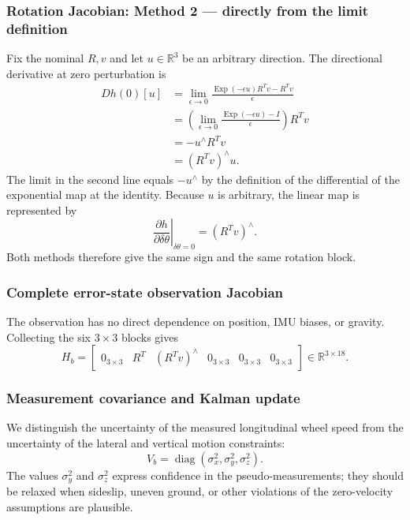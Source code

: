 \documentclass[11pt]{article}
\numberwithin{equation}{section}
\newcommand{\Exp}{\operatorname{Exp}}
\begin{document}
\subsubsection*{Rotation Jacobian: Method 2 --- directly from the limit definition}

Fix the nominal $R,v$ and let $u\in\mathbb R^3$ be an arbitrary
direction. The directional derivative at zero perturbation is
\begin{align}
 Dh(0)[u]
 &=\lim_{\epsilon\to0}
 \frac{\Exp(-\epsilon u)R^Tv-R^Tv}{\epsilon}\\
 &=\left(\lim_{\epsilon\to0}
 \frac{\Exp(-\epsilon u)-I}{\epsilon}\right)R^Tv\\
 &=-u^\wedge R^Tv\\
 &=(R^Tv)^\wedge u.
\end{align}
The limit in the second line equals $-u^\wedge$ by the definition
of the differential of the exponential map at the identity.
Because $u$ is arbitrary, the linear map is represented by
\begin{equation}
\boxed{
\left.\frac{\partial h}{\partial\delta\theta}\right|_{\delta\theta=0}
 =(R^Tv)^\wedge.
}
\end{equation}
Both methods therefore give the same sign and the same rotation block.

\subsubsection*{Complete error-state observation Jacobian}

The observation has no direct dependence on position, IMU biases, or gravity.
Collecting the six $3\times3$ blocks gives
\begin{equation}
\boxed{
H_b=\begin{bmatrix}
0_{3\times3}&R^T&(R^Tv)^\wedge&0_{3\times3}&0_{3\times3}&0_{3\times3}
\end{bmatrix}\in\mathbb R^{3\times18}.
}
\end{equation}

\subsubsection*{Measurement covariance and Kalman update}

We distinguish the uncertainty of the measured longitudinal wheel speed
from the uncertainty of the lateral and vertical motion constraints:
\begin{equation}
\boxed{V_b=\operatorname{diag}(\sigma_x^2,\sigma_y^2,\sigma_z^2).}
\end{equation}
The values $\sigma_y^2$ and $\sigma_z^2$ express confidence in the
pseudo-measurements; they should be relaxed when sideslip, uneven ground,
or other violations of the zero-velocity assumptions are plausible.
\end{document}
